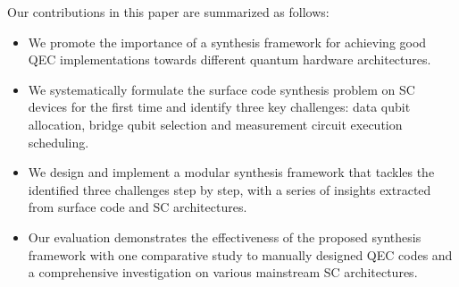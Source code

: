 Our contributions in this paper are summarized as follows:
\begin{itemize}
    \item We promote the importance of a synthesis framework for achieving good QEC implementations towards different quantum hardware architectures.
    \item We systematically formulate the surface code synthesis problem on SC devices for the first time and identify three key challenges: data qubit allocation, bridge qubit selection and  measurement circuit execution scheduling. %
    \item We design and implement a modular synthesis framework that tackles the identified three challenges step by step, with a series of insights extracted from surface code and SC architectures.
    \item Our evaluation demonstrates the effectiveness of the proposed synthesis framework with one comparative study to manually designed QEC codes and a comprehensive investigation on various mainstream SC architectures. 
\end{itemize}






